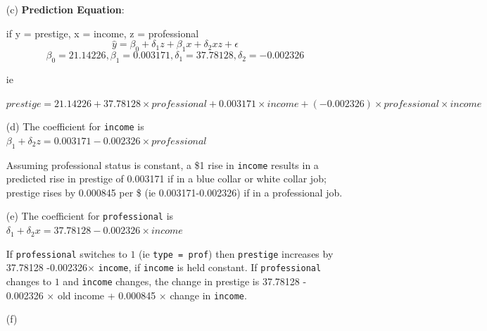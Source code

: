 \documentclass[12pt,letterpaper]{article}
\begin{document}
\begin{enumerate}
\clearpage

	\item [(c)] \textbf{Prediction Equation}:

    if y = prestige, x = income, z = professional
\begin{equation}\label{eq:pred}
    \hat{y}  =  \beta_0 + \delta_1 z + \beta_1x +\delta_2 xz + \epsilon
\end{equation}
\[ \beta_0 = 21.14226, \beta_1 = 0.003171, \delta_1 = 37.78128, \delta_2 = -0.002326\]

  ie
  
    $prestige =
      21.14226 + 37.78128\times professional + 0.003171\times income +
      (-0.002326)\times professional\times income$

	\item [(d)] 	%
	The coefficient for \texttt{income} is $\beta_1 +\delta_2 z = 0.003171 -0.002326\times professional$ 
	
	Assuming professional status is constant, a \$1 rise in \texttt{income} results in a predicted rise in prestige of 0.003171 if in a blue collar or white collar job; prestige rises by 0.000845 per \$ (ie 0.003171-0.002326) if in a professional job.
	
	\item [(e)] %
	The coefficient for \texttt{professional} is $\delta_1  + \delta_2 x =  37.78128-0.002326\times income$
	
  If \texttt{professional} switches to $1$ (ie \texttt{type = prof}) then \texttt{prestige} increases by 37.78128 -0.002326$\times$ \texttt{income}, if \texttt{income} is held constant.
  If \texttt{professional} changes to $1$ and \texttt{income} changes, the change in prestige is 37.78128 - 0.002326 $\times$ old income + 0.000845 $\times$ change in \texttt{income}.
	
	\item [(f)]
	

\end{enumerate}
\end{document}
